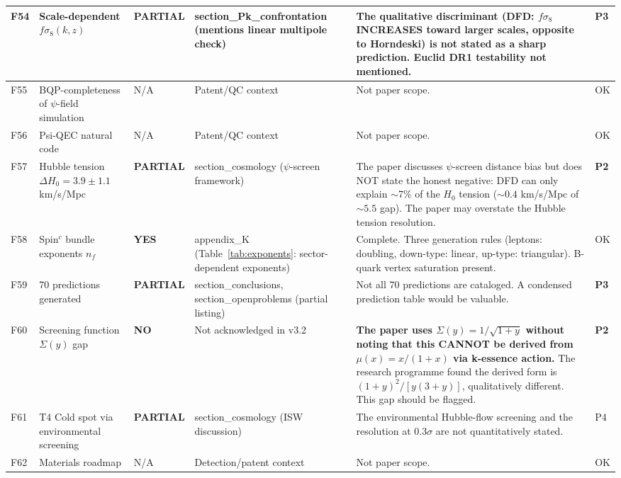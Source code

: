 \documentclass[11pt,a4paper]{article}
\newcommand{\YES}{\textcolor{yes}{\textbf{YES}}}
\newcommand{\PARTIAL}{\textcolor{partial}{\textbf{PARTIAL}}}
\newcommand{\NO}{\textcolor{no}{\textbf{NO}}}
\begin{document}
\begin{longtable}{|p{0.5cm}|p{3.5cm}|p{1.2cm}|p{3.5cm}|p{4.5cm}|p{1cm}|}
F54 & Scale-dependent $f\sigma_8(k,z)$ &
\PARTIAL &
section\_Pk\_confrontation (mentions linear multipole check) &
The qualitative discriminant (DFD: $f\sigma_8$ INCREASES toward larger scales, opposite to Horndeski) is not stated as a sharp prediction. Euclid DR1 testability not mentioned. &
\textbf{P3} \\
\hline

F55 & BQP-completeness of $\psi$-field simulation &
N/A & Patent/QC context & Not paper scope. & OK \\
\hline

F56 & Psi-QEC natural code &
N/A & Patent/QC context & Not paper scope. & OK \\
\hline

F57 & Hubble tension $\Delta H_0 = 3.9 \pm 1.1$ km/s/Mpc &
\PARTIAL &
section\_cosmology ($\psi$-screen framework) &
The paper discusses $\psi$-screen distance bias but does NOT state the honest negative: DFD can only explain $\sim$7\% of the $H_0$ tension ($\sim 0.4$ km/s/Mpc of $\sim 5.5$ gap). The paper may overstate the Hubble tension resolution. &
\textbf{P2} \\
\hline

F58 & Spin$^c$ bundle exponents $n_f$ &
\YES &
appendix\_K (Table~\ref{tab:exponents}: sector-dependent exponents) &
Complete. Three generation rules (leptons: doubling, down-type: linear, up-type: triangular). B-quark vertex saturation present. &
OK \\
\hline

F59 & 70 predictions generated &
\PARTIAL &
section\_conclusions, section\_openproblems (partial listing) &
Not all 70 predictions are cataloged. A condensed prediction table would be valuable. &
\textbf{P3} \\
\hline

F60 & Screening function $\Sigma(y)$ gap &
\NO &
Not acknowledged in v3.2 &
\textbf{The paper uses $\Sigma(y) = 1/\sqrt{1+y}$ without noting that this CANNOT be derived from $\mu(x) = x/(1+x)$ via k-essence action.} The research programme found the derived form is $(1+y)^2/[y(3+y)]$, qualitatively different. This gap should be flagged. &
\textbf{P2} \\
\hline

F61 & T4 Cold spot via environmental screening &
\PARTIAL &
section\_cosmology (ISW discussion) &
The environmental Hubble-flow screening and the resolution at $0.3\sigma$ are not quantitatively stated. &
P4 \\
\hline

F62 & Materials roadmap &
N/A & Detection/patent context & Not paper scope. & OK \\
\hline


\end{longtable}
\end{document}
